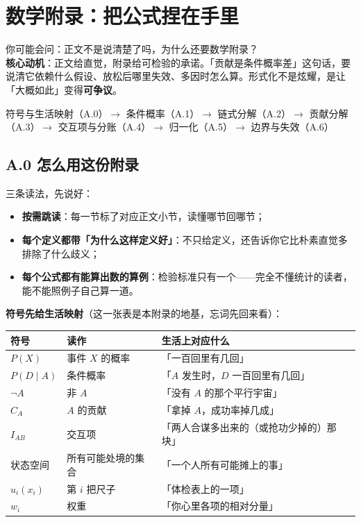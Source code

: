 \documentclass[../../main2.tex]{subfiles}
\begin{document}
\chapter{数学附录：把公式捏在手里}
\label{app:v2math}

\begin{motivation}
	你可能会问：正文不是说清楚了吗，为什么还要数学附录？\\
	\textbf{核心动机}：正文给直觉，附录给可检验的承诺。「贡献是条件概率差」这句话，要说清它依赖什么假设、放松后哪里失效、多因时怎么算。形式化不是炫耀，是让「大概如此」变得\textbf{可争议}。
\end{motivation}

\begin{logicmap}
	符号与生活映射（A.0）$\rightarrow$ 条件概率（A.1）$\rightarrow$ 链式分解（A.2）$\rightarrow$ 贡献分解（A.3）$\rightarrow$ 交互项与分账（A.4）$\rightarrow$ 归一化（A.5）$\rightarrow$ 边界与失效（A.6）
\end{logicmap}

\section{A.0 怎么用这份附录}

三条读法，先说好：

\begin{itemize}
	\item \textbf{按需跳读}：每一节标了对应正文小节，读懂哪节回哪节；
	\item \textbf{每个定义都带「为什么这样定义好」}：不只给定义，还告诉你它比朴素直觉多排除了什么歧义；
	\item \textbf{每个公式都有能算出数的算例}：检验标准只有一个——完全不懂统计的读者，能不能照例子自己算一道。
\end{itemize}

\textbf{符号先给生活映射}（这一张表是本附录的地基，忘词先回来看）：

\begin{center}
\begin{tabular}{lll}
\toprule
符号 & 读作 & 生活上对应什么 \\
\midrule
$P(X)$ & 事件 $X$ 的概率 & 「一百回里有几回」 \\
$P(D \mid A)$ & 条件概率 & 「$A$ 发生时，$D$ 一百回里有几回」 \\
$\neg A$ & 非 $A$ & 「没有 $A$ 的那个平行宇宙」 \\
$C_A$ & $A$ 的贡献 & 「拿掉 $A$，成功率掉几成」 \\
$I_{AB}$ & 交互项 & 「两人合谋多出来的（或抢功少掉的）那块」 \\
状态空间 & 所有可能处境的集合 & 「一个人所有可能摊上的事」 \\
$u_i(x_i)$ & 第 $i$ 把尺子 & 「体检表上的一项」 \\
$w_i$ & 权重 & 「你心里各项的相对分量」 \\
\bottomrule
\end{tabular}
\end{center}
\end{document}

